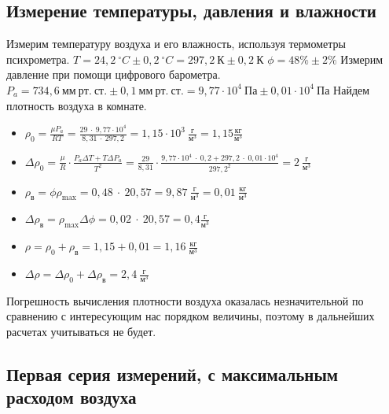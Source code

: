\documentclass[a4paper,11pt]{article}
\begin{document}
\subsection{Измерение температуры, давления и влажности}
Измерим температуру воздуха и его влажность, используя термометры психрометра.\newline\newline
$T = 24,2\ ^{\circ} C \pm 0,2\ ^{\circ} C = 297,2\ К \pm 0,2\ К$\newline\newline
$\phi = 48\% \pm 2\%$\newline\newline
Измерим давление при помощи цифрового барометра.\newline\newline
$P_{a} = 734,6\ мм\ рт.\ ст. \pm 0,1\ мм\ рт.\ ст. = 9,77 \cdot 10^{4}\ Па \pm 0,01 \cdot 10^{4}\ Па$\newline\newline
Найдем плотность воздуха в комнате.\newline
\begin{itemize}
  \item $\rho_{0} = \frac{\mu P_{a}}{RT} = \frac{29\ \cdot\ 9,77 \cdot 10^{4}}{8,31\ \cdot\ 297,2} = 1,15 \cdot 10^{3}\ \frac{г}{м^{3}} = 1,15 \frac{кг}{м^{3}}$
  \item $\Delta \rho_{0} = \frac{\mu}{R} \cdot \frac{P_{a} \Delta T + T \Delta P_{a}}{T^{2}} = \frac{29}{8,31} \cdot \frac{9,77 \cdot 10^{4}\ \cdot\ 0,2 + 297,2\ \cdot\ 0,01 \cdot 10^{4}}{297,2^{2}} = 2\ \frac{г}{м^{3}}$
  \item $\rho_{в} = \phi \rho_{\max} = 0,48\ \cdot\ 20,57 = 9,87\ \frac{г}{м^{3}} = 0,01\ \frac{кг}{м^{3}}$
  \item $\Delta \rho_{в}= \rho_{\max}\Delta \phi = 0,02\ \cdot\ 20,57 = 0,4 \frac{г}{м^{3}}$
  \item $\rho = \rho_{0} + \rho_{в} = 1,15 + 0,01 = 1,16\ \frac{кг}{м^{3}}$
  \item $\Delta \rho = \Delta \rho_{0} + \Delta \rho_{в} = 2,4\ \frac{г}{м^{3}}$
\end{itemize}
Погрешность вычисления плотности воздуха оказалась незначительной по сравнению с интересующим нас порядком величины, поэтому в дальнейших расчетах учитываться не будет.
\subsection{Первая серия измерений, с максимальным расходом воздуха}
\end{document}

